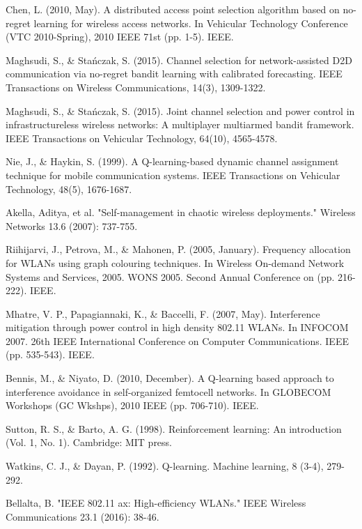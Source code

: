 \documentclass[conference]{IEEEtran}
\begin{document}
	\begin{thebibliography}{20}
		
		 Chen, L. (2010, May). A distributed access point selection algorithm based on no-regret learning for wireless access networks. In Vehicular Technology Conference (VTC 2010-Spring), 2010 IEEE 71st (pp. 1-5). IEEE.
		
		 Maghsudi, S., \& Stańczak, S. (2015). Channel selection for network-assisted D2D communication via no-regret bandit learning with calibrated forecasting. IEEE Transactions on Wireless Communications, 14(3), 1309-1322.	
		
		 Maghsudi, S., \& Stańczak, S. (2015). Joint channel selection and power control in infrastructureless wireless networks: A multiplayer multiarmed bandit framework. IEEE Transactions on Vehicular Technology, 64(10), 4565-4578.
		
		 Nie, J., \& Haykin, S. (1999). A Q-learning-based dynamic channel assignment technique for mobile communication systems. IEEE Transactions on Vehicular Technology, 48(5), 1676-1687.
		
		 Akella, Aditya, et al. "Self-management in chaotic wireless deployments." Wireless Networks 13.6 (2007): 737-755.
		
		 Riihijarvi, J., Petrova, M., \& Mahonen, P. (2005, January). Frequency allocation for WLANs using graph colouring techniques. In Wireless On-demand Network Systems and Services, 2005. WONS 2005. Second Annual Conference on (pp. 216-222). IEEE.
		
		 Mhatre, V. P., Papagiannaki, K., \& Baccelli, F. (2007, May). Interference mitigation through power control in high density 802.11 WLANs. In INFOCOM 2007. 26th IEEE International Conference on Computer Communications. IEEE (pp. 535-543). IEEE.
		
		 Bennis, M., \& Niyato, D. (2010, December). A Q-learning based approach to interference avoidance in self-organized femtocell networks. In GLOBECOM Workshops (GC Wkshps), 2010 IEEE (pp. 706-710). IEEE.
		
		 Sutton, R. S., \& Barto, A. G. (1998). Reinforcement learning: An introduction (Vol. 1, No. 1). Cambridge: MIT press.
		
		 Watkins, C. J., \& Dayan, P. (1992). Q-learning. Machine learning, 8 (3-4), 279-292.
		
		 Bellalta, B. "IEEE 802.11 ax: High-efficiency WLANs." IEEE Wireless Communications 23.1 (2016): 38-46.  
		
	\end{thebibliography}	
	
\end{document}

